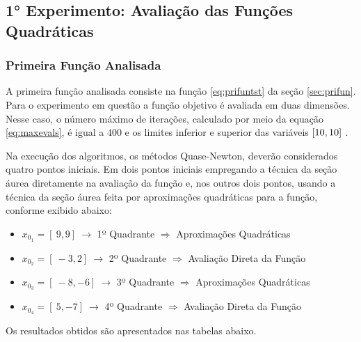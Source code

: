 

\subsection{1° Experimento: Avaliação das Funções Quadráticas}
    \subsubsection{Primeira Função Analisada}

    A primeira função analisada consiste na função \ref{eq:prifuntst} da seção \ref{sec:prifun}.
    Para o experimento em questão a função objetivo é avaliada em duas dimensões. Nesse caso, o número máximo de iterações, calculado por meio da equação \ref{eq:maxevals}, é igual a $400$ e os limites inferior e superior das variáveis $[\-10, 10 ]\ $.

    Na execução dos algoritmos, os métodos Quase-Newton, deverão considerados quatro pontos iniciais. Em dois pontos iniciais empregando a técnica da seção áurea diretamente na avaliação da função e, nos outros dois pontos, usando  a técnica da seção áurea feita por aproximações quadráticas para a função, conforme exibido abaixo:
    \begin{itemize}
        \item $x_{0_1}=[\ 9 , 9 ]\ \rightarrow$ 1º Quadrante $\Rightarrow$ Aproximações Quadráticas  
        \item $x_{0_2}=[\ -3 , 2 ]\ \rightarrow$ 2º Quadrante $\Rightarrow$ Avaliação Direta da Função
        \item $x_{0_3}=[\ -8 , -6 ]\ \rightarrow$ 3º Quadrante $\Rightarrow$ Aproximações Quadráticas  
        \item $x_{0_4}=[\ 5 , -7 ]\ \rightarrow$ 4º Quadrante $\Rightarrow$ Avaliação Direta da Função
    \end{itemize} 

    Os resultados obtidos são apresentados nas tabelas abaixo.
    \vspace{2mm}
    
